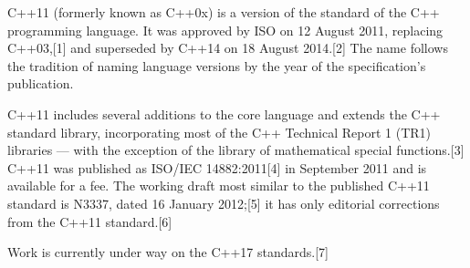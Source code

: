 C++11 (formerly known as C++0x) is a version of the standard of the C++ programming language. It was approved by ISO on 12 August 2011, replacing C++03,[1] and superseded by C++14 on 18 August 2014.[2] The name follows the tradition of naming language versions by the year of the specification's publication.
 
C++11 includes several additions to the core language and extends the C++ standard library, incorporating most of the C++ Technical Report 1 (TR1) libraries — with the exception of the library of mathematical special functions.[3] C++11 was published as ISO/IEC 14882:2011[4] in September 2011 and is available for a fee. The working draft most similar to the published C++11 standard is N3337, dated 16 January 2012;[5] it has only editorial corrections from the C++11 standard.[6]
 
Work is currently under way on the C++17 standards.[7]
